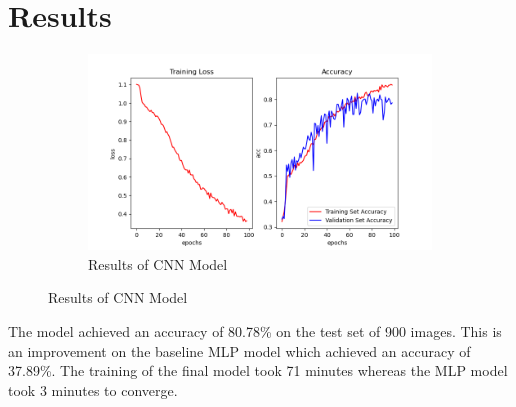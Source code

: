 \documentclass[../main.tex]{subfiles}
\begin{document}
\section{Results}

\begin{figure}[h!]
  \centering
  \begin{subfigure}[b]{0.7\linewidth}
    \includegraphics[width=\linewidth]{ResultsNew.png}
    \caption{Results of CNN Model}
  \end{subfigure}
  \label{fig:model-results}
\end{figure}

The model achieved an accuracy of 80.78\% on the test set of 900 images. This is an improvement on the baseline MLP model which achieved an accuracy of 37.89\%. The training of the final model took 71 minutes whereas the MLP model took 3 minutes to converge.  
\end{document}
